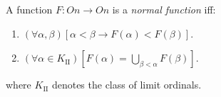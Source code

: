 A function $F: On \rightarrow On$ is a \textit{normal function} iff:
\begin{enumerate}
\item $(\forall \alpha, \beta)[\alpha < \beta \rightarrow F(\alpha) < F(\beta)]$.
\item $(\forall \alpha \in K_{\mathrm{II}})\left[ F(\alpha) = \bigcup_{\beta < \alpha} F(\beta) \right]$.
\end{enumerate}
where $K_{\mathrm{II}}$ denotes the class of limit ordinals.
